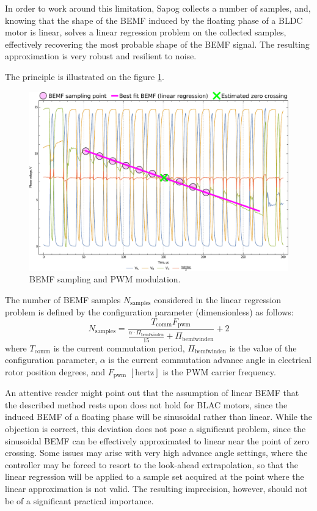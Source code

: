 \documentclass{zubaxdoc}
\begin{document}
In order to work around this limitation, Sapog collects a number of samples, and,
knowing that the shape of the BEMF induced by the floating phase of a BLDC motor is linear,
solves a linear regression problem on the collected samples, effectively recovering the most probable
shape of the BEMF signal.
The resulting approximation is very robust and resilient to noise.

The principle is illustrated on the figure \ref{phase_voltage_sampling}.

\begin{figure}[hbtp]
    \centering
	\includegraphics[width=\textwidth]{phase_voltage_sampling}
	\caption{BEMF sampling and PWM modulation.
	\label{phase_voltage_sampling}}
\end{figure}

The number of BEMF samples $N_\text{samples}$ considered in the linear regression problem is defined by
the configuration parameter  (dimensionless) as follows:
\begin{equation}
N_\text{samples} =
\frac{T_{\text{comm}} F_{\text{pwm}}}{\frac{\alpha\cdot{}\Pi_\text{bemfwinden}}{15} + \Pi_\text{bemfwinden}} + 2
\end{equation}
where $T_{\text{comm}}$ is the current commutation period,
$\Pi_\text{bemfwinden}$ is the value of the configuration parameter,
$\alpha$ is the current commutation advance angle in electrical rotor position degrees,
and $F_{\text{pwm}}$ $\left[\text{hertz}\right]$ is the PWM carrier frequency.

An attentive reader might point out that the assumption of linear BEMF that the described method rests
upon does not hold for BLAC motors, since the induced BEMF of a floating phase will be sinusoidal rather
than linear.
While the objection is correct, this deviation does not pose a significant problem, since the sinusoidal
BEMF can be effectively approximated to linear near the point of zero crossing.
Some issues may arise with very high advance angle settings, where the controller may be forced to resort to
the look-ahead extrapolation, so that the linear regression will be applied to a sample set acquired
at the point where the linear approximation is not valid.
The resulting imprecision, however, should not be of a significant practical importance.
\end{document}
